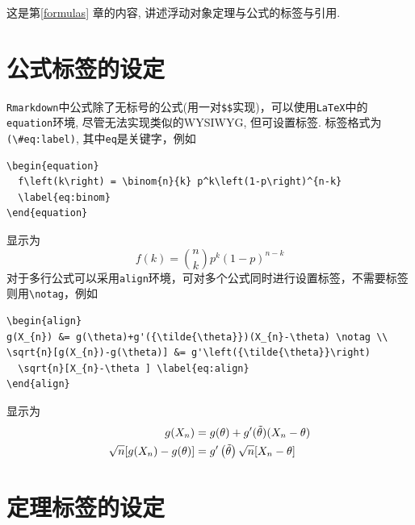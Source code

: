 \documentclass[12pt,]{krantz}
\theoremstyle{plain}
\theoremstyle{nonumberplain}
\begin{document}
\indent

这是第\ref{formulas} 章的内容, 讲述浮动对象定理与公式的标签与引用. \autocite{xie2015,bookdown2016}

\hypertarget{sec4-1}{%
\section{公式标签的设定}\label{sec4-1}}

\indent

\texttt{Rmarkdown}中公式除了无标号的公式(用一对\texttt{\$\$}实现)，可以使用\texttt{LaTeX}中的\texttt{equation}环境, 尽管无法实现类似的WYSIWYG, 但可设置标签. 标签格式为 \texttt{(\textbackslash{}\#eq:label)}, 其中\texttt{eq}是关键字，例如

\begin{verbatim}
\begin{equation} 
  f\left(k\right) = \binom{n}{k} p^k\left(1-p\right)^{n-k}
  \label{eq:binom}
\end{equation} 
\end{verbatim}

显示为
\begin{equation} 
  f\left(k\right) = \binom{n}{k} p^k\left(1-p\right)^{n-k}
  \label{eq:binom}
\end{equation}
对于多行公式可以采用\texttt{align}环境，可对多个公式同时进行设置标签，不需要标签则用\texttt{\textbackslash{}notag}，例如

\begin{verbatim}
\begin{align} 
g(X_{n}) &= g(\theta)+g'({\tilde{\theta}})(X_{n}-\theta) \notag \\
\sqrt{n}[g(X_{n})-g(\theta)] &= g'\left({\tilde{\theta}}\right)
  \sqrt{n}[X_{n}-\theta ] \label{eq:align}
\end{align}
\end{verbatim}

显示为
\begin{align} 
g(X_{n}) &= g(\theta)+g'({\tilde{\theta}})(X_{n}-\theta) \notag \\
\sqrt{n}[g(X_{n})-g(\theta)] &= g'\left({\tilde{\theta}}\right)
  \sqrt{n}[X_{n}-\theta ] \label{eq:align}
\end{align}

\hypertarget{sec4-2}{%
\section{定理标签的设定}\label{sec4-2}}

\indent
\end{document}
